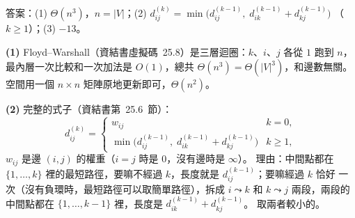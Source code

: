 \begin{pastsoln}
答案：(1) $\Theta(n^3)$，$n = |V|$；(2) $d_{ij}^{(k)} = \min\bigl(d_{ij}^{(k-1)},\; d_{ik}^{(k-1)} + d_{kj}^{(k-1)}\bigr)$
（$k \ge 1$）；(3) $-13$。

\textbf{(1)} Floyd--Warshall（資結書虛擬碼~25.8）是三層迴圈：$k$、$i$、$j$ 各從 $1$ 跑到 $n$，
最內層一次比較和一次加法是 $O(1)$，總共 $\Theta(n^3) = \Theta(|V|^3)$，和邊數無關。 空間用一個
$n \times n$ 矩陣原地更新即可，$\Theta(n^2)$。

\textbf{(2)} 完整的式子（資結書第~25.6~節）：
\[
d_{ij}^{(k)} =
\begin{cases}
w_{ij} & k = 0,\\
\min\bigl(d_{ij}^{(k-1)},\; d_{ik}^{(k-1)} + d_{kj}^{(k-1)}\bigr) & k \ge 1,
\end{cases}
\]
$w_{ij}$ 是邊 $(i, j)$ 的權重（$i = j$ 時是 $0$，沒有邊時是 $\infty$）。 理由：中間點都在
$\{1, \ldots, k\}$ 裡的最短路徑，要嘛不經過 $k$，長度就是 $d_{ij}^{(k-1)}$；要嘛經過 $k$ 恰好
一次（沒有負環時，最短路徑可以取簡單路徑），拆成 $i \leadsto k$ 和 $k \leadsto j$ 兩段，兩段的
中間點都在 $\{1, \ldots, k-1\}$ 裡，長度是 $d_{ik}^{(k-1)} + d_{kj}^{(k-1)}$。 取兩者較小的。


\end{pastsoln}

